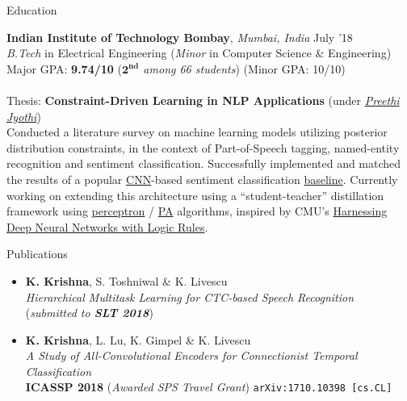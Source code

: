 \documentclass{resume} %
\begin{document}
\vspace*{-1mm}
\begin{rSection}{Education}

{\bf Indian Institute of Technology Bombay}, \textit{Mumbai, India} \hfill {July '18} \\ 
\textit{B.Tech} in Electrical Engineering (\textit{Minor} in Computer Science \& Engineering)\\
Major GPA: \textbf{9.74/10} (\textit{$\mathbf{2^{nd}}$ among 66 students}) (Minor GPA: 10/10)\\\\
Thesis: \textbf{Constraint-Driven Learning in NLP Applications} (under \textit{\href{https://www.cse.iitb.ac.in/~pjyothi/}{Preethi Jyothi}}) \\
Conducted a literature survey on machine learning models utilizing posterior distribution constraints, in the context of Part-of-Speech tagging, named-entity recognition and sentiment classification. Successfully implemented and matched the results of a popular \href{https://en.wikipedia.org/wiki/Convolutional_neural_network}{CNN}-based sentiment classification \href{https://arxiv.org/abs/1408.5882}{baseline}. Currently working on extending this architecture using a ``student-teacher'' distillation framework using \href{http://www.cs.columbia.edu/~mcollins/papers/tagperc.pdf}{perceptron} / \href{http://jmlr.csail.mit.edu/papers/volume7/crammer06a/crammer06a.pdf}{PA} algorithms, inspired by CMU's \href{https://arxiv.org/pdf/1603.06318.pdf}{Harnessing Deep Neural Networks with Logic Rules}.
\end{rSection}
\vspace*{-1.5mm}
\begin{rSection}{Publications}
\begin{itemize}[leftmargin=*]
\item \textbf{K. Krishna}, S. Toshniwal \& K. Livescu\\\textit{Hierarchical Multitask Learning for CTC-based Speech Recognition}\\ (\textit{submitted to \textbf{SLT 2018}})
\item \textbf{K. Krishna}, L. Lu, K. Gimpel \&  K. Livescu\\\textit{A Study of All-Convolutional Encoders for Connectionist Temporal Classification}\\ \textbf{ICASSP 2018} (\textit{Awarded SPS Travel Grant}) \texttt{arXiv:1710.10398 [cs.CL]} 
\end{itemize}
\end{rSection}
\end{document}
